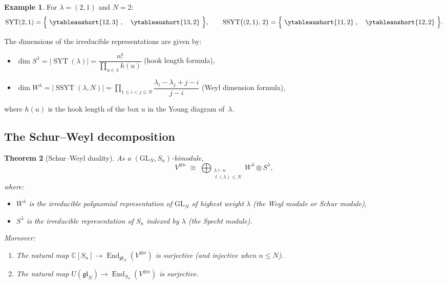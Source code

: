\documentclass[12pt,a4paper]{article}
\newtheorem{theorem}{Theorem}[section]
\theoremstyle{definition}
\newtheorem{example}[theorem]{Example}
\theoremstyle{remark}
\newcommand{\C}{\mathbb{C}}
\newcommand{\gl}{\mathfrak{gl}}
\newcommand{\End}{\operatorname{End}}
\newcommand{\SYT}{\operatorname{SYT}}
\newcommand{\SSYT}{\operatorname{SSYT}}
\begin{document}
\begin{example}\label{ex:tableaux-21}
For $\lambda = (2,1)$ and $N = 2$:
\[
  \SYT(2,1) = \Bigl\{\;
    \ytableaushort{12,3}\;,\quad
    \ytableaushort{13,2}\;
  \Bigr\},
  \qquad
  \SSYT\bigl((2,1),\, 2\bigr) = \Bigl\{\;
    \ytableaushort{11,2}\;,\quad
    \ytableaushort{12,2}\;
  \Bigr\}.
\]
\end{example}

The dimensions of the irreducible representations are given by:
\begin{itemize}
\item $\dim S^\lambda = |\SYT(\lambda)| = \dfrac{n!}{\prod_{u \in \lambda} h(u)}$
  \quad (hook length formula),
\item $\dim W^\lambda = |\SSYT(\lambda, N)|
  = \prod_{1 \leqslant i < j \leqslant N}
    \dfrac{\lambda_i - \lambda_j + j - i}{j - i}$
  \quad (Weyl dimension formula),
\end{itemize}
where $h(u)$ is the hook length of the box $u$ in the Young diagram
of~$\lambda$.

\subsection{The Schur--Weyl decomposition}

\begin{theorem}[Schur--Weyl duality]\label{thm:SW}
As a $(\mathrm{GL}_N, S_n)$-bimodule,
\begin{equation}\label{eq:SW}
  V^{\otimes n}
  \;\cong\;
  \bigoplus_{\substack{\lambda \vdash n \\ \ell(\lambda) \leqslant N}}
  W^\lambda \otimes S^\lambda,
\end{equation}
where:
\begin{itemize}
\item $W^\lambda$ is the irreducible polynomial representation of
  $\mathrm{GL}_N$ of highest weight $\lambda$ (the \emph{Weyl module}
  or \emph{Schur module}),
\item $S^\lambda$ is the irreducible representation of $S_n$ indexed
  by $\lambda$ (the \emph{Specht module}).
\end{itemize}
Moreover:
\begin{enumerate}[label=(\alph*)]
\item The natural map
  $\C[S_n] \to \End_{\gl_N}(V^{\otimes n})$
  is surjective (and injective when $n \leqslant N$).
\item The natural map
  $U(\gl_N) \to \End_{S_n}(V^{\otimes n})$
  is surjective.
\end{enumerate}
\end{theorem}
\end{document}
